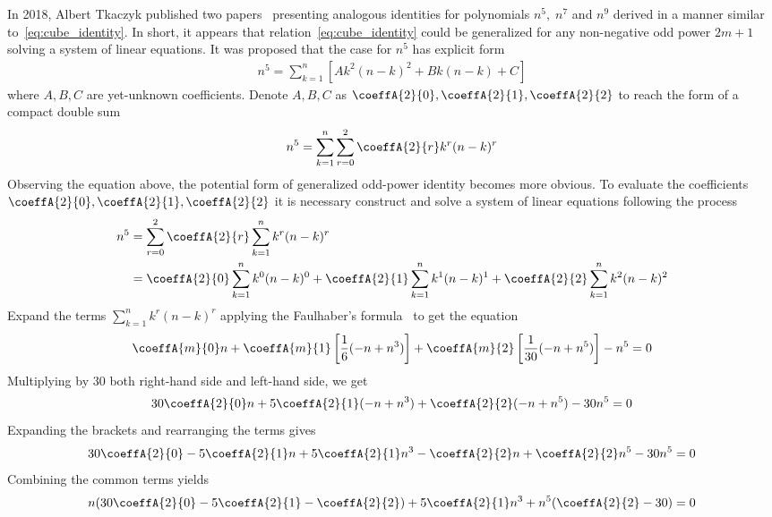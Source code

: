 In 2018, Albert Tkaczyk published two papers~\cite{tkaczyk2018problem, tkaczyk2018continuation}
presenting analogous identities for polynomials $n^5, \; n^7$ and $n^9$ derived in a manner similar to~\eqref{eq:cube_identity}.
In short, it appears that relation~\eqref{eq:cube_identity} could be generalized
for any non-negative odd power $2m+1$ solving a system of linear equations.
It was proposed that the case for $n^5$ has explicit form
\begin{align*}
    n^5 = \sum_{k=1}^{n} \left[ A k^2(n-k)^2 + Bk(n-k) + C \right]
\end{align*}
where $A,B,C$ are yet-unknown coefficients.
Denote $A,B,C$ as $\coeffA{2}{0}, \coeffA{2}{1}, \coeffA{2}{2}$
to reach the form of a compact double sum
\begin{align*}
    n^5 = \sum_{k=1}^{n} \sum_{r=0}^{2} \coeffA{2}{r} k^r (n-k)^r
\end{align*}
Observing the equation above, the potential form of generalized odd-power identity becomes more obvious.
To evaluate the coefficients $\coeffA{2}{0}, \coeffA{2}{1}, \coeffA{2}{2}$
it is necessary construct and solve a system of linear equations following the process
\begin{align*}
    n^5 &= \sum_{r=0}^{2} \coeffA{2}{r} \sum_{k=1}^{n} k^r (n-k)^r \\
    &= \coeffA{2}{0} \sum_{k=1}^{n} k^0 (n-k)^0 + \coeffA{2}{1} \sum_{k=1}^{n} k^1 (n-k)^1 + \coeffA{2}{2} \sum_{k=1}^{n} k^2 (n-k)^2
\end{align*}
Expand the terms $\sum_{k=1}^{n} k^r (n-k)^r$ applying the
Faulhaber's formula~\cite{beardon1996sums}
to get the equation
\begin{equation*}
    \coeffA{m}{0} n
    + \coeffA{m}{1} \left[ \frac{1}{6} (-n + n^3) \right]
    + \coeffA{m}{2} \left[ \frac{1}{30} (-n + n^5) \right] - n^5 = 0
\end{equation*}
Multiplying by $30$ both right-hand side and left-hand side, we get
\begin{equation*}
    30 \coeffA{2}{0} n + 5 \coeffA{2}{1} (-n + n^3) + \coeffA{2}{2} (-n + n^5) - 30n^5 = 0
\end{equation*}
Expanding the brackets and rearranging the terms gives
\begin{equation*}
    30 \coeffA{2}{0} - 5 \coeffA{2}{1} n + 5 \coeffA{2}{1} n^3 - \coeffA{2}{2} n + \coeffA{2}{2} n^5 - 30n^5 = 0
\end{equation*}
Combining the common terms yields
\begin{equation*}
    n (30 \coeffA{2}{0} - 5 \coeffA{2}{1} - \coeffA{2}{2}) + 5 \coeffA{2}{1} n^3 + n^5 (\coeffA{2}{2} - 30) = 0
\end{equation*}
